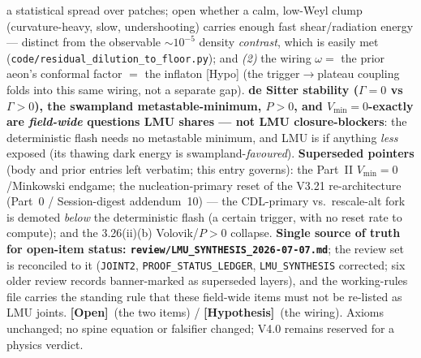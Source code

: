 \documentclass[11pt]{article}
\newcommand{\hyp}{\textcolor{orange!80!black}{\textbf{[Hypothesis]}}}
\newcommand{\open}{\textcolor{red!70!black}{\textbf{[Open]}}}
\begin{document}
{a statistical spread over patches; open whether a calm, low-Weyl clump (curvature-heavy, slow, undershooting) carries enough fast shear/radiation energy --- distinct from the observable $\sim10^{-5}$ density \emph{contrast}, which is easily met (\texttt{code/residual\_dilution\_to\_floor.py}); and \emph{(2)} the wiring $\omega=$ the prior aeon's conformal factor $=$ the inflaton [Hypo] (the trigger$\to$plateau coupling folds into this same wiring, not a separate gap). \textbf{de Sitter stability ($\Gamma=0$ vs $\Gamma>0$), the swampland metastable-minimum, $P>0$, and $V_{\min}=0$-exactly are \emph{field-wide} questions LMU shares --- not LMU closure-blockers}: the deterministic flash needs no metastable minimum, and LMU is if anything \emph{less} exposed (its thawing dark energy is swampland-\emph{favoured}). \textbf{Superseded pointers} (body and prior entries left verbatim; this entry governs): the Part~II $V_{\min}=0$/Minkowski endgame; the nucleation-primary reset of the V3.21 re-architecture (Part~0 / Session-digest addendum~10) --- the CDL-primary vs.\ rescale-alt fork is demoted \emph{below} the deterministic flash (a certain trigger, with no reset rate to compute); and the 3.26(ii)(b) Volovik/$P>0$ collapse. \textbf{Single source of truth for open-item status: \texttt{review/LMU\_SYNTHESIS\_2026-07-07.md}}; the review set is reconciled to it (\texttt{JOINT2}, \texttt{PROOF\_STATUS\_LEDGER}, \texttt{LMU\_SYNTHESIS} corrected; six older review records banner-marked as superseded layers), and the working-rules file carries the standing rule that these field-wide items must not be re-listed as LMU joints. \open\ (the two items) / \hyp\ (the wiring). Axioms unchanged; no spine equation or falsifier changed; V4.0 remains reserved for a physics verdict.

}
\end{document}
